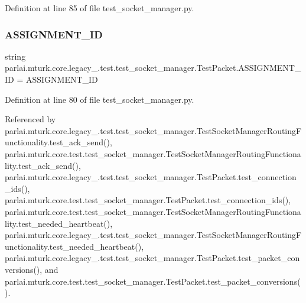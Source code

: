 Definition at line 85 of file test\+\_\+socket\+\_\+manager.\+py.

\mbox{\label{classparlai_1_1mturk_1_1core_1_1legacy__2018_1_1test_1_1test__socket__manager_1_1TestPacket_afb992cc9a74df5f87f53f2ea15d1b32c}} 
\subsubsection{\texorpdfstring{A\+S\+S\+I\+G\+N\+M\+E\+N\+T\+\_\+\+ID}{ASSIGNMENT\_ID}}
{\footnotesize\ttfamily string parlai.\+mturk.\+core.\+legacy\+\_.\+test.\+test\+\_\+socket\+\_\+manager.\+Test\+Packet.\+A\+S\+S\+I\+G\+N\+M\+E\+N\+T\+\_\+\+ID = \textquotesingle{}A\+S\+S\+I\+G\+N\+M\+E\+N\+T\+\_\+\+ID\textquotesingle{}\hspace{0.3cm}{\ttfamily [static]}}



Definition at line 80 of file test\+\_\+socket\+\_\+manager.\+py.



Referenced by parlai.\+mturk.\+core.\+legacy\+\_.\+test.\+test\+\_\+socket\+\_\+manager.\+Test\+Socket\+Manager\+Routing\+Functionality.\+test\+\_\+ack\+\_\+send(), parlai.\+mturk.\+core.\+test.\+test\+\_\+socket\+\_\+manager.\+Test\+Socket\+Manager\+Routing\+Functionality.\+test\+\_\+ack\+\_\+send(), parlai.\+mturk.\+core.\+legacy\+\_.\+test.\+test\+\_\+socket\+\_\+manager.\+Test\+Packet.\+test\+\_\+connection\+\_\+ids(), parlai.\+mturk.\+core.\+test.\+test\+\_\+socket\+\_\+manager.\+Test\+Packet.\+test\+\_\+connection\+\_\+ids(), parlai.\+mturk.\+core.\+test.\+test\+\_\+socket\+\_\+manager.\+Test\+Socket\+Manager\+Routing\+Functionality.\+test\+\_\+needed\+\_\+heartbeat(), parlai.\+mturk.\+core.\+legacy\+\_.\+test.\+test\+\_\+socket\+\_\+manager.\+Test\+Socket\+Manager\+Routing\+Functionality.\+test\+\_\+needed\+\_\+heartbeat(), parlai.\+mturk.\+core.\+legacy\+\_.\+test.\+test\+\_\+socket\+\_\+manager.\+Test\+Packet.\+test\+\_\+packet\+\_\+conversions(), and parlai.\+mturk.\+core.\+test.\+test\+\_\+socket\+\_\+manager.\+Test\+Packet.\+test\+\_\+packet\+\_\+conversions().

